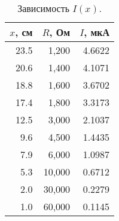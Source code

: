 \begin{table} 
\begin{center}
 \caption{Зависимость $I(x)$.}
 \label{table1}
\begin{tabular}{|*{3}{r|}}
\hline 
$x$, см & $R$, Ом & $I$, мкА \\ \hline 
 23.5 & 1,200  & 4.6622 \\ \hline 
 20.6 & 1,400  & 4.1071 \\ \hline 
 18.8 & 1,600  & 3.6702 \\ \hline 
 17.4 & 1,800  & 3.3173 \\ \hline 
 12.5 & 3,000  & 2.1037 \\ \hline 
 9.6  & 4,500  & 1.4435 \\ \hline 
 7.9  & 6,000  & 1.0987 \\ \hline 
 5.3  & 10,000 & 0.6712 \\ \hline 
 2.0  & 30,000 & 0.2279 \\ \hline 
 1.0  & 60,000 & 0.1145 \\ \hline 
 \end{tabular} 
 \end{center}
\end{table} 

